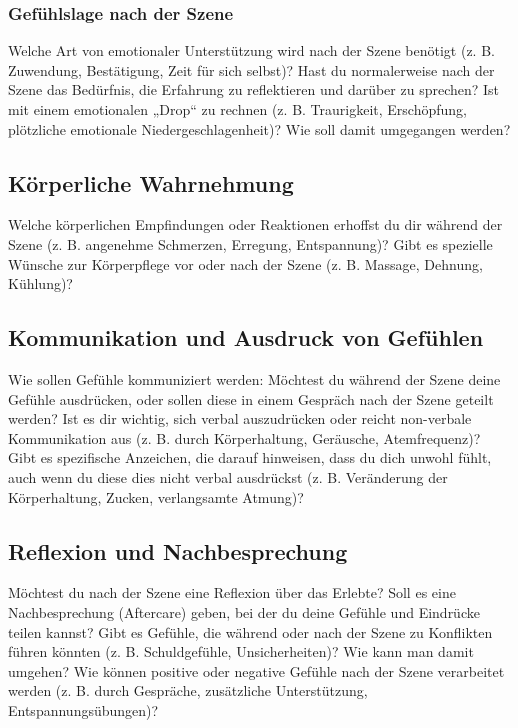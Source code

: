 \documentclass[a4paper,12pt]{article}
\begin{document}
\subsubsection{Gefühlslage nach der Szene}
\noindent Welche Art von emotionaler Unterstützung wird nach der Szene benötigt (z. B. Zuwendung, Bestätigung, Zeit für sich selbst)? Hast du normalerweise nach der Szene das Bedürfnis, die Erfahrung zu reflektieren und darüber zu sprechen? Ist mit einem emotionalen „Drop“ zu rechnen (z. B. Traurigkeit, Erschöpfung, plötzliche emotionale Niedergeschlagenheit)? Wie soll damit umgegangen werden? \newline
\noindent \TextField[name=WahrNach,multiline=true,height=10em, width=37em]{}
        
\subsection{Körperliche Wahrnehmung}
\noindent Welche körperlichen Empfindungen oder Reaktionen erhoffst du dir während der Szene (z. B. angenehme Schmerzen, Erregung, Entspannung)? Gibt es spezielle Wünsche zur Körperpflege vor oder nach der Szene (z. B. Massage, Dehnung, Kühlung)? \newline
\noindent \TextField[name=WahrKoer,multiline=true,height=10em, width=37em]{}

\subsection{Kommunikation und Ausdruck von Gefühlen}
\noindent Wie sollen Gefühle kommuniziert werden: Möchtest du während der Szene deine Gefühle ausdrücken, oder sollen diese in einem Gespräch nach der Szene geteilt werden? Ist es dir wichtig, sich verbal auszudrücken oder reicht non-verbale Kommunikation aus (z. B. durch Körperhaltung, Geräusche, Atemfrequenz)? Gibt es spezifische Anzeichen, die darauf hinweisen, dass du dich unwohl fühlt, auch wenn du diese dies nicht verbal ausdrückst (z. B. Veränderung der Körperhaltung, Zucken, verlangsamte Atmung)?\newline
\noindent \TextField[name=WahrKomm,multiline=true,height=30em, width=37em]{}

\subsection{Reflexion und Nachbesprechung}
\noindent Möchtest du nach der Szene eine Reflexion über das Erlebte? Soll es eine Nachbesprechung (Aftercare) geben, bei der du deine Gefühle und Eindrücke teilen kannst? Gibt es Gefühle, die während oder nach der Szene zu Konflikten führen könnten (z. B. Schuldgefühle, Unsicherheiten)? Wie kann man damit umgehen? Wie können positive oder negative Gefühle nach der Szene verarbeitet werden (z. B. durch Gespräche, zusätzliche Unterstützung, Entspannungsübungen)? \newline
\noindent \TextField[name=WahrReflex,multiline=true,height=20em, width=37em]{}
\end{document}

